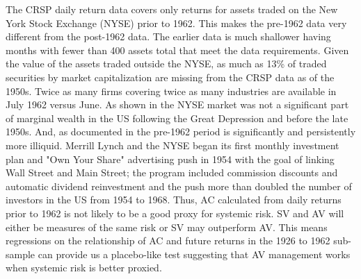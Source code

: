 
The CRSP daily return data covers only returns for assets traded on the New York Stock Exchange (NYSE) prior to 1962. This makes the pre-1962 data very different from the post-1962 data. The earlier data is much shallower having months with fewer than 400 assets total that meet the data requirements. Given the value of the assets traded outside the NYSE, as much as 13\% of traded securities by market capitalization are missing from the CRSP data as of the 1950s. \citep{nyse_history,staff_american_2003} Twice as many firms covering twice as many industries are available in July 1962 versus June. As shown in \citet{taylor_2014} the NYSE market was not a significant part of marginal wealth in the US following the Great Depression and before the late 1950s. And, as documented in \citet{jones_century_2002} the pre-1962 period is significantly and persistently more illiquid. Merrill Lynch and the NYSE began its first monthly investment plan and "Own Your Share" advertising push in 1954 with the goal of linking Wall Street and Main Street; the program included commission discounts and automatic dividend reinvestment and the push more than doubled the number of investors in the US from 1954 to 1968. \citep{noauthor_investment_1964,traflet_own_2003}  Thus, AC calculated from daily returns prior to 1962 is not likely to be a good proxy for systemic risk. SV and AV will either be measures of the same risk or SV may outperform AV. This means regressions on the relationship of AC and future returns in the 1926 to 1962 sub-sample can provide us a placebo-like test suggesting that AV management works when systemic risk is better proxied.

